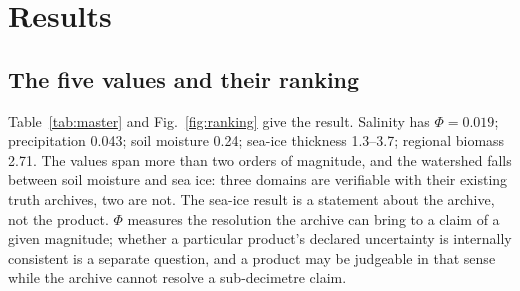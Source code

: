 \documentclass[preprint,12pt,authoryear]{elsarticle}
\begin{document}
\section{Results}
\label{sec:results}

\subsection{The five values and their ranking}

Table~\ref{tab:master} and Fig.~\ref{fig:ranking} give the result. Salinity has $\Phi = 0.019$; precipitation 0.043; soil moisture 0.24; sea-ice thickness 1.3--3.7; regional biomass 2.71. The values span more than two orders of magnitude, and the watershed falls between soil moisture and sea ice: three domains are verifiable with their existing truth archives, two are not. The sea-ice result is a statement about the archive, not the product. $\Phi$ measures the resolution the archive can bring to a claim of a given magnitude; whether a particular product's declared uncertainty is internally consistent is a separate question, and a product may be judgeable in that sense while the archive cannot resolve a sub-decimetre claim.
\end{document}
